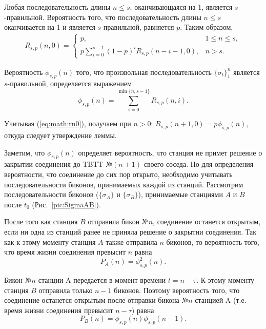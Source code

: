 Любая последовательность длины $n \leq  s$, оканчивающаяся на 1, является $s$-правильной. Вероятность того, что последовательность длины $n \leq  s$ оканчивается на 1 и является $s$-правильной, равняется $p$. Таким образом,
 \begin{eqnarray}
 \label{eq:math:rn_final}
R_{s,p}(n,0) = \left\{ \begin{array}{ll}
                p, 					     & 1 \leq n \leq s, \\
                p \sum \limits^{s-1}_{i=0} (1-p)^i R_{s,p}(n-i-1,0), & n > s.
               \end{array} \right.
\end{eqnarray}

Вероятность $\phi_{s,p}(n)$ того, что произвольная последовательность $\{\sigma_t\}_1^n$ является $s$-правильной, определяется выражением
\[
\phi_{s,p}(n) = \sum \limits^{\min\{n,s-1\}}_{i=0} R_{s,p}(n,i).
\]

Учитывая (\ref{eq:math:rn0}), получаем при $n>0$: $R_{s,p}(n+1,0) = p \phi_{s,p}(n)$, откуда следует утверждение леммы.


Заметим, что $\phi_{s,p}(n)$ определяет вероятность, что станция не примет решение о закрытии соединения до TBTT №$(n+1)$ своего соседа. Но для определения вероятности, что соединение до сих пор открыто, необходимо учитывать последовательности биконов, принимаемых каждой из станций. Рассмотрим последовательности биконов ($\{\sigma_A\}$ и $\{\sigma_B\}$), принимаемые станциями $A$ и $B$ после $t_0$ (Рис.~\ref{pic:SigmaAB}).

После того как станция $B$ отправила бикон №$n$, соединение останется открытым, если ни одна из станций ранее не приняла решение о закрытии соединения. Так как к этому моменту станция $A$ также отправила $n$ биконов, то вероятность того, что время жизни соединения превысит $n$ равна
\begin{equation}
\label{eq:math:P_A}
 P_A(n) = \phi_{s,p}^2(n).
\end{equation}

Бикон №$n$ станции A передается в момент времени $t=n-\tau$. К этому моменту станция $B$ отправила только $n-1$ биконов. Поэтому вероятность того, что соединение останется открытым после отправки бикона №$n$ станцией A (т.е. время жизни соединения превысит $n-\tau$) равна
\begin{equation}
\label{eq:math:P_B}
 P_B(n) = \phi_{s,p}(n)\phi_{s,p}(n-1).
\end{equation}

